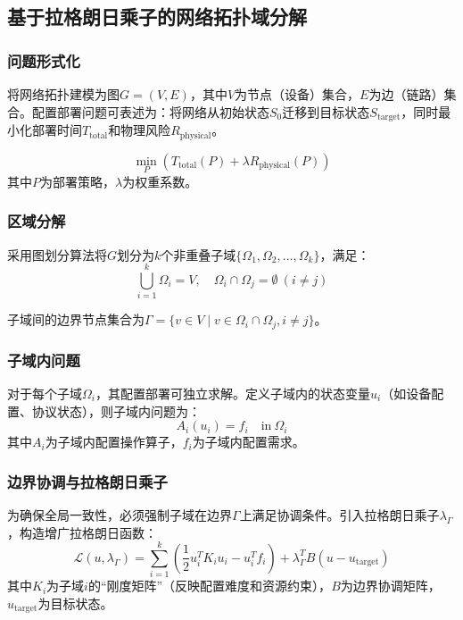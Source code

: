 \documentclass[12pt,a4paper]{article}
\begin{document}
\subsection{基于拉格朗日乘子的网络拓扑域分解}
\label{subsec:decomposition}

\subsubsection{问题形式化}
将网络拓扑建模为图$G=(V,E)$，其中$V$为节点（设备）集合，$E$为边（链路）集合。配置部署问题可表述为：将网络从初始状态$S_0$迁移到目标状态$S_{\text{target}}$，同时最小化部署时间$T_{\text{total}}$和物理风险$R_{\text{physical}}$。

\begin{equation}
    \min_{P} \left( T_{\text{total}}(P) + \lambda R_{\text{physical}}(P) \right)
    \label{eq:optimization}
\end{equation}
其中$P$为部署策略，$\lambda$为权重系数。

\subsubsection{区域分解}
采用图划分算法将$G$划分为$k$个非重叠子域$\{\Omega_1, \Omega_2, \ldots, \Omega_k\}$，满足：
\begin{equation}
    \bigcup_{i=1}^k \Omega_i = V, \quad \Omega_i \cap \Omega_j = \emptyset \ (i \neq j)
    \label{eq:partition}
\end{equation}

子域间的边界节点集合为$\Gamma = \{v \in V \mid v \in \Omega_i \cap \Omega_j, i \neq j\}$。

\subsubsection{子域内问题}
对于每个子域$\Omega_i$，其配置部署可独立求解。定义子域内的状态变量$u_i$（如设备配置、协议状态），则子域内问题为：
\begin{equation}
    A_i(u_i) = f_i \quad \text{in} \ \Omega_i
    \label{eq:local_problem}
\end{equation}
其中$A_i$为子域内配置操作算子，$f_i$为子域内配置需求。

\subsubsection{边界协调与拉格朗日乘子}
为确保全局一致性，必须强制子域在边界$\Gamma$上满足协调条件。引入拉格朗日乘子$\lambda_{\Gamma}$，构造增广拉格朗日函数：
\begin{equation}
    \mathcal{L}(u, \lambda_{\Gamma}) = \sum_{i=1}^k \left( \frac{1}{2} u_i^T K_i u_i - u_i^T f_i \right) + \lambda_{\Gamma}^T B(u - u_{\text{target}})
    \label{eq:lagrangian}
\end{equation}
其中$K_i$为子域$i$的“刚度矩阵”（反映配置难度和资源约束），$B$为边界协调矩阵，$u_{\text{target}}$为目标状态。
\end{document}
